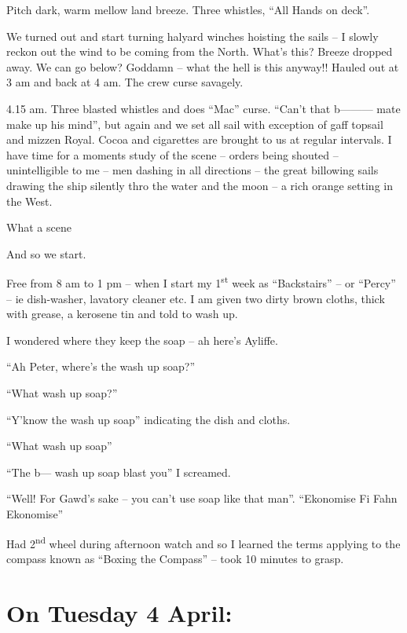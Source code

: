 \documentclass[
  11pt,
  msmallroyalvopaper
]{memoir}
\begin{document}
Pitch dark, warm mellow land breeze. Three whistles, ``All Hands on
deck''.

We turned out and start turning halyard winches hoisting the sails -- I
slowly reckon out the wind to be coming from the North. What's this?
Breeze dropped away. We can go below? Goddamn -- what the hell is this
anyway!! Hauled out at 3 am and back at 4 am. The crew curse savagely.

4.15 am. Three blasted whistles and does ``Mac'' curse. ``Can't that
b--------- mate make up his mind'', but again and we set all sail with
exception of gaff topsail and mizzen Royal. Cocoa and cigarettes are
brought to us at regular intervals. I have time for a moments study of
the scene -- orders being shouted -- unintelligible to me -- men dashing
in all directions -- the great billowing sails drawing the ship silently
thro the water and the moon -- a rich orange setting in the West.

What a scene

And so we start.

Free from 8 am to 1 pm -- when I start my 1\textsuperscript{st} week as
``Backstairs'' -- or ``Percy'' -- ie dish-washer, lavatory cleaner etc.
I am given two dirty brown cloths, thick with grease, a kerosene tin and
told to wash up.

I wondered where they keep the soap -- ah here's Ayliffe.

``Ah Peter, where's the wash up soap?''

``What wash up soap?''

``Y'know the wash up soap'' indicating the dish and cloths.

``What wash up soap''

``The b--- wash up soap blast you'' I screamed.

``Well! For Gawd's sake -- you can't use soap like that man''.
``Ekonomise Fi Fahn Ekonomise''

Had 2\textsuperscript{nd} wheel during afternoon watch and so I learned
the terms applying to the compass known as ``Boxing the Compass'' --
took 10 minutes to grasp.

\hypertarget{on-tuesday-4-april}{%
\section{On Tuesday 4 April:}\label{on-tuesday-4-april}}
\end{document}
